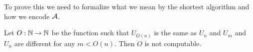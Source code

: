 To prove this we need to formalize what we mean by the shortest algorithm and
how we encode $\mathcal{A}$.
\begin{theorem}
  Let $O : {\mathbb{N}} \to {\mathbb{N}}$ be the function such that
  $U_{O(n)}$ is the same as $U_n$ and $U_m$ and $U_n$ are different
  for any $m < O(n)$. Then $O$ is not computable.
\end{theorem}

%
